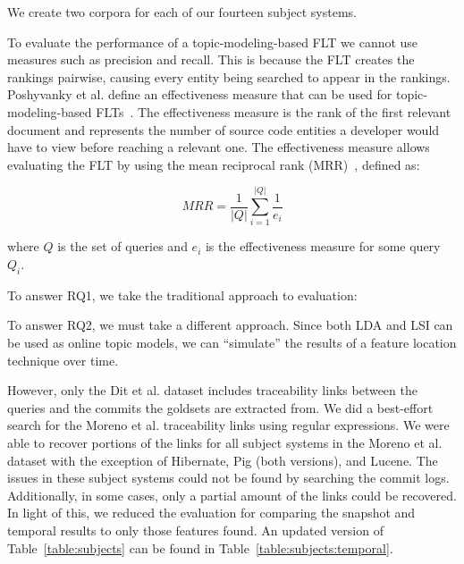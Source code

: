 We create two corpora for each of our fourteen subject systems.

To evaluate the performance of a topic-modeling-based FLT we cannot use
measures such as precision and recall. This is because the FLT creates
the rankings pairwise, causing every entity being searched to appear in the rankings.
Poshyvanky et al. define an effectiveness measure that can be used for topic-modeling-based FLTs~\cite{Poshyvanyk-etal:2007}.
The effectiveness measure is the rank of the first relevant document
and represents the number of source code entities a developer would have to view before reaching a relevant one.
The effectiveness measure allows evaluating the FLT by using
the mean reciprocal rank (MRR)~\cite{Voorhees:1999}, defined as:

\begin{equation}
    MRR = \frac{1}{|Q|} \sum_{i=1}^{|Q|} \frac{1}{e_i}
\end{equation}

where $Q$ is the set of queries
and $e_i$ is the effectiveness measure for some query $Q_i$.

To answer RQ1, we take the traditional approach to evaluation:

To answer RQ2, we must take a different approach.
Since both LDA and LSI can be used as online topic models, we can
``simulate'' the results of a feature location technique over time.

However, only the Dit et al. dataset includes traceability links between
the queries and the commits the goldsets are extracted from.
We did a best-effort search for the Moreno et al. traceability links
using regular expressions.
We were able to recover portions of the links for all subject systems in
the Moreno et al. dataset with the exception of Hibernate, Pig (both versions), and Lucene.
The issues in these subject systems could not be found by searching the commit logs.
Additionally, in some cases, only a partial amount of the links could be
recovered. In light of this, we reduced the evaluation for comparing the
snapshot and temporal results to only those features found.
An updated version of Table~\ref{table:subjects} can be found in Table~\ref{table:subjects:temporal}.

